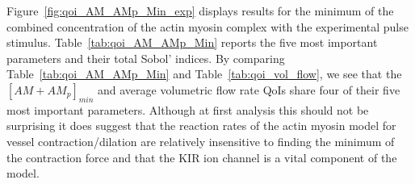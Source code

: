 \documentclass[smallextended]{svjour3}
\numberwithin{equation}{section}
\begin{document}
Figure~\ref{fig:qoi_AM_AMp_Min_exp} displays results for the minimum of the combined concentration of the actin myosin complex with the experimental pulse stimulus. Table~\ref{tab:qoi_AM_AMp_Min} reports the five most important parameters and their total Sobol' indices. By comparing Table~\ref{tab:qoi_AM_AMp_Min} and Table~\ref{tab:qoi_vol_flow}, we see that the $[AM+AM_p]_{min}$ and average volumetric flow rate QoIs share four of their five most important parameters. Although at first analysis this should not be surprising it does suggest that the reaction rates of the actin myosin model for vessel contraction/dilation are relatively insensitive to finding the minimum of the contraction force and that the KIR ion channel is a vital component of the model. 
\begin{figure}[h]
\centering


\end{figure}
\end{document}
